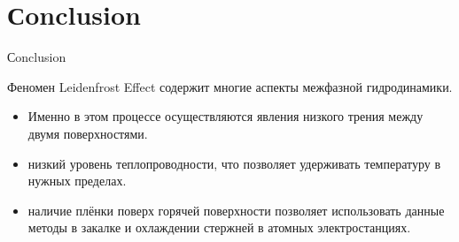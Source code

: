 \section{Сonclusion}
\begin{frame}{Сonclusion}
\begin{block}{Феномен Leidenfrost Effect содержит многие аспекты межфазной гидродинамики.}
\begin{itemize}
    \item Именно в этом процессе осуществляются явления низкого трения между двумя поверхностями.
    \item низкий уровень теплопроводности, что позволяет удерживать температуру в нужных пределах.
    \item наличие плёнки поверх горячей поверхности позволяет использовать данные методы в закалке и охлаждении стержней в атомных электростанциях.
\end{itemize}
\end{block}
	
\end{frame}